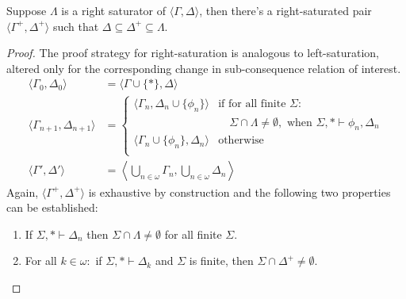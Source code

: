 \documentclass[10pt]{article}
\begin{document}
\begin{lemma}\label{lindenbaum:right}
  Suppose \(\Lambda\) is a right saturator of \(\langle \Gamma, \Delta \rangle\), then there's a right-saturated pair \(\langle \Gamma^{+},\Delta^{+} \rangle\) such that \(\Delta \subseteq \Delta^{+} \subseteq \Lambda\).
  \begin{proof}
    The proof strategy for right-saturation is analogous to left-saturation, altered only for the corresponding change in sub-consequence relation of interest.
    \begin{align*}
      \langle \Gamma_{0},\Delta_{0} \rangle &= \langle \Gamma \cup \{\ast\},\Delta \rangle \\
      \langle \Gamma_{n+1},\Delta_{n+1} \rangle &=
                                                  \begin{cases}
                                                    \langle \Gamma_{n}, \Delta_{n} \cup \{\phi_{n}\} \rangle &\text{if for all finite } \Sigma \colon\\
                                                    &\quad \Sigma \cap \Lambda \ne \emptyset, \text{ when } \Sigma,\ast \vdash \phi_{n},\Delta_{n} \\
                                                    \langle \Gamma_{n} \cup \{\phi_{n}\},\Delta_{n} \rangle &\text{otherwise} \\
                                                  \end{cases}
      \\
      \langle \Gamma',\Delta' \rangle &= \left\langle \bigcup_{n \in \omega}\Gamma_{n}, \bigcup_{n\in\omega}\Delta_{n} \right\rangle
    \end{align*}
    Again, \(\langle \Gamma^{+},\Delta^{+} \rangle\) is exhaustive by construction and the following two properties can be established:
    \begin{enumerate}[label=(\arabic*)]
    \item\label{rightLindenbaum:1} If \(\Sigma,\ast \vdash \Delta_{n}\) then \(\Sigma \cap \Lambda \ne \emptyset\) for all finite \(\Sigma\).
    \item\label{rightLindenbaum:2} For all \(k \in \omega \colon\) if \(\Sigma, \ast \vdash \Delta_{k}\) and \(\Sigma\) is finite, then \(\Sigma \cap \Delta^{+} \ne \emptyset\).
    \end{enumerate}
  \end{proof}
\end{lemma}
\end{document}
